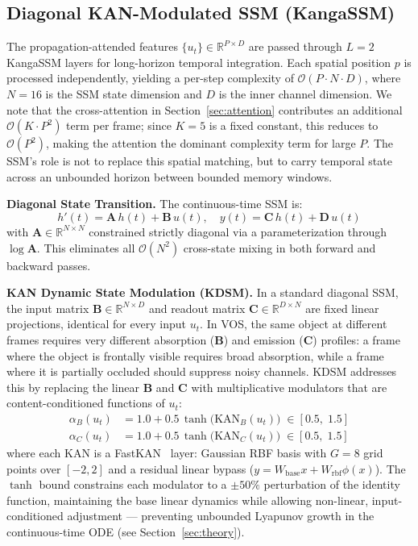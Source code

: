 \documentclass[sigconf]{acmart}
\begin{document}
\subsection{Diagonal KAN-Modulated SSM (KangaSSM)}
\label{sec:kanga}
The propagation-attended features $\{u_t\} \in \mathbb{R}^{P \times D}$ are passed through $L=2$ KangaSSM layers for long-horizon temporal integration. Each spatial position $p$ is processed independently, yielding a per-step complexity of $\mathcal{O}(P \cdot N \cdot D)$, where $N=16$ is the SSM state dimension and $D$ is the inner channel dimension. We note that the cross-attention in Section~\ref{sec:attention} contributes an additional $\mathcal{O}(K \cdot P^2)$ term per frame; since $K=5$ is a fixed constant, this reduces to $\mathcal{O}(P^2)$, making the attention the dominant complexity term for large $P$. The SSM's role is not to replace this spatial matching, but to carry temporal state across an unbounded horizon between bounded memory windows.

\textbf{Diagonal State Transition.} The continuous-time SSM is:
\begin{equation}
    h'(t) = \mathbf{A}\,h(t) + \mathbf{B}\,u(t), \quad y(t) = \mathbf{C}\,h(t) + \mathbf{D}\,u(t)
\end{equation}
with $\mathbf{A} \in \mathbb{R}^{N \times N}$ constrained strictly diagonal via a parameterization through $\log\mathbf{A}$. This eliminates all $\mathcal{O}(N^2)$ cross-state mixing in both forward and backward passes.

\textbf{KAN Dynamic State Modulation (KDSM).} In a standard diagonal SSM, the input matrix $\mathbf{B} \in \mathbb{R}^{N \times D}$ and readout matrix $\mathbf{C} \in \mathbb{R}^{D \times N}$ are fixed linear projections, identical for every input $u_t$. In VOS, the same object at different frames requires very different absorption ($\mathbf{B}$) and emission ($\mathbf{C}$) profiles: a frame where the object is frontally visible requires broad absorption, while a frame where it is partially occluded should suppress noisy channels. KDSM addresses this by replacing the linear $\mathbf{B}$ and $\mathbf{C}$ with multiplicative modulators that are content-conditioned functions of $u_t$:
\begin{align}
    \alpha_B(u_t) &= 1.0 + 0.5\,\tanh\!\bigl(\mathrm{KAN}_B(u_t)\bigr) \;\in [0.5,\; 1.5] \label{eq:alpha_B}\\
    \alpha_C(u_t) &= 1.0 + 0.5\,\tanh\!\bigl(\mathrm{KAN}_C(u_t)\bigr) \;\in [0.5,\; 1.5] \label{eq:alpha_C}
\end{align}
where each $\mathrm{KAN}$ is a FastKAN~\cite{li2024fastkan} layer: Gaussian RBF basis with $G=8$ grid points over $[-2, 2]$ and a residual linear bypass ($y = W_\text{base}x + W_\text{rbf}\phi(x)$). The $\tanh$ bound constrains each modulator to a $\pm50\%$ perturbation of the identity function, maintaining the base linear dynamics while allowing non-linear, input-conditioned adjustment — preventing unbounded Lyapunov growth in the continuous-time ODE (see Section~\ref{sec:theory}).
\end{document}
